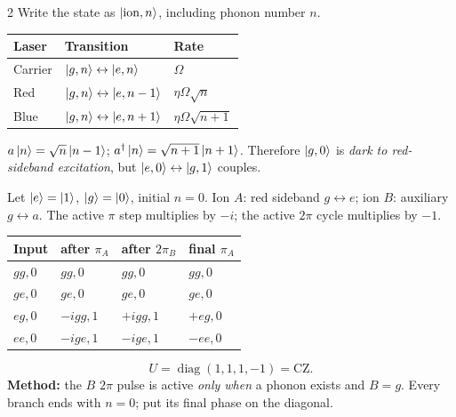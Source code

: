 \begin{multicols}{2}
Write the state as $\left\lvert \text{ion},n\right\rangle$, including phonon number $n$.
\begin{center}\footnotesize
\begin{tabular}{@{}lll@{}}\toprule
Laser&Transition&Rate\\\midrule
Carrier&$\left\lvert g,n\right\rangle\leftrightarrow\left\lvert e,n\right\rangle$&$\Omega$\\
Red&$\left\lvert g,n\right\rangle\leftrightarrow\left\lvert e,n-1\right\rangle$&$\eta\Omega\sqrt{n}$\\
Blue&$\left\lvert g,n\right\rangle\leftrightarrow\left\lvert e,n+1\right\rangle$&$\eta\Omega\sqrt{n+1}$\\
\bottomrule\end{tabular}
\end{center}
$a\left\lvert n\right\rangle=\sqrt n\left\lvert n-1\right\rangle$; $a^\dagger\left\lvert n\right\rangle=\sqrt{n+1}\left\lvert n+1\right\rangle$. Therefore $\left\lvert g,0\right\rangle$ is \emph{dark to red-sideband excitation}, but $\left\lvert e,0\right\rangle\leftrightarrow\left\lvert g,1\right\rangle$ couples.

Let $\left\lvert e\right\rangle=\left\lvert 1\right\rangle$, $\left\lvert g\right\rangle=\left\lvert 0\right\rangle$, initial $n=0$. Ion $A$: red sideband $g\leftrightarrow e$; ion $B$: auxiliary $g\leftrightarrow a$. The active $\pi$ step multiplies by $-i$; the active $2\pi$ cycle multiplies by $-1$.
\begin{center}\footnotesize\renewcommand{\arraystretch}{1.14}
\begin{tabular}{@{}llll@{}}\toprule
Input&after $\pi_A$&after $2\pi_B$&final $\pi_A$\\\midrule
$gg,0$&$gg,0$&$gg,0$&$gg,0$\\
$ge,0$&$ge,0$&$ge,0$&$ge,0$\\
$eg,0$&$-i gg,1$&$+i gg,1$&$+eg,0$\\
$ee,0$&$-i ge,1$&$-i ge,1$&$-ee,0$\\
\bottomrule\end{tabular}
\end{center}
\[\boxed{U=\operatorname{diag}(1,1,1,-1)=\mathrm{CZ}.}\]
\textbf{Method:} the $B$ $2\pi$ pulse is active \emph{only when} a phonon exists and $B=g$. Every branch ends with $n=0$; put its final phase on the diagonal.


\end{multicols}
